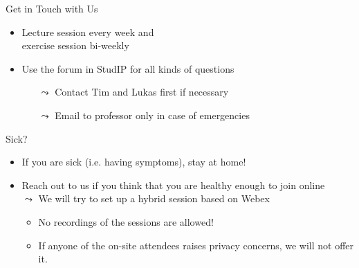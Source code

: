 \documentclass[aspectratio=169,handout]{../latex_main/tntbeamer}  %
\begin{document}
\begin{frame}[c]{Get in Touch with Us}

\begin{itemize}
  \item Lecture session every week and\\ exercise session bi-weekly
  \item \alert{Use the forum in StudIP for all kinds of questions}
  \begin{itemize}
        \item[$\leadsto$] Contact Tim and Lukas first if necessary 
      \item[$\leadsto$] Email to professor only in case of emergencies
  \end{itemize}
\end{itemize}

\end{frame}
\begin{frame}[c]{Sick?}

\begin{itemize}
  \item If you are sick (i.e. having symptoms), stay at home!
  \item Reach out to us if you think that you are healthy enough to join online\\ $\leadsto$ We will try to set up a hybrid session based on Webex
  \begin{itemize}
      \item No recordings of the sessions are allowed!
      \item If anyone of the on-site attendees raises privacy concerns, we will not offer it.
  \end{itemize}
\end{itemize}

\end{frame}
\end{document}
